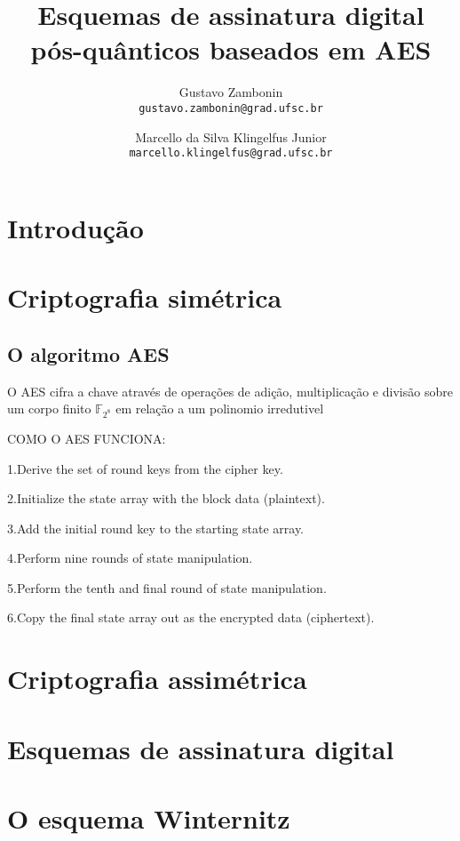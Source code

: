 \documentclass{article}
\title{Esquemas de assinatura digital pós-quânticos baseados em AES}
\author{Gustavo Zambonin \\ \texttt{gustavo.zambonin@grad.ufsc.br} \and Marcello da Silva Klingelfus Junior \\ \texttt{marcello.klingelfus@grad.ufsc.br}}
\date{}
\begin{document}
\maketitle


\section*{Introdução}

\section*{Criptografia simétrica}

\subsection*{O algoritmo AES}

O AES cifra a chave através de operações de adição, multiplicação e divisão sobre um corpo finito $\mathbb{F}_{2^{8}}$ em relação a um polinomio irredutivel 


COMO O AES FUNCIONA:

1.Derive the set of round keys from the cipher key.

2.Initialize the state array with the block data (plaintext).

3.Add the initial round key to the starting state array.

4.Perform nine rounds of state manipulation.

5.Perform the tenth and final round of state manipulation.

6.Copy the final state array out as the encrypted data (ciphertext).


\section*{Criptografia assimétrica}

\section*{Esquemas de assinatura digital}

\section*{O esquema Winternitz}
\end{document}
